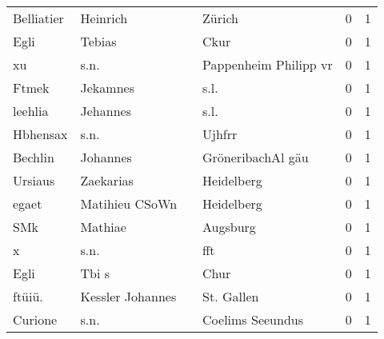 \documentclass[10pt,a4paper,landscape]{article}
\begin{document}
\begin{longtable}{llllrr}
               Belliatier &                           Heinrich &             &                                      Zürich &          0 &         1 \\
                     Egli &                             Tebias &             &                                        Ckur &          0 &         1 \\
                       xu &                               s.n. &             &                       Pappenheim Philipp vr &          0 &         1 \\
                    Ftmek &                           Jekamnes &             &                                        s.l. &          0 &         1 \\
                  leehlia &                           Jehannes &             &                                        s.l. &          0 &         1 \\
                 Hbhensax &                               s.n. &             &                                      Ujhfrr &          0 &         1 \\
                  Bechlin &                           Johannes &             &                           GröneribachAl gäu &          0 &         1 \\
                  Ursiaus &                          Zaekarias &             &                                  Heidelberg &          0 &         1 \\
                    egaet &                     Matihieu CSoWn &             &                                  Heidelberg &          0 &         1 \\
                      SMk &                            Mathiae &             &                                    Augsburg &          0 &         1 \\
                        x &                               s.n. &             &                                         fft &          0 &         1 \\
                     Egli &                              Tbi s &             &                                        Chur &          0 &         1 \\
                   ftüiü. &                   Kessler Johannes &             &                                  St. Gallen &          0 &         1 \\
                  Curione &                               s.n. &             &                            Coelims Seeundus &          0 &         1 \\

\end{longtable}
\end{document}
